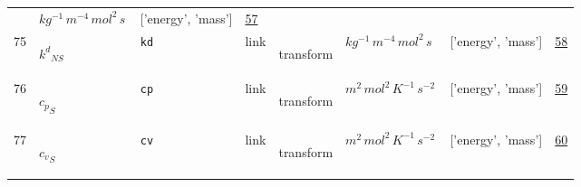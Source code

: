 \begin{longtable}{|p{1cm}|p{3cm}|p{3cm}|p{7cm}|p{3.0cm}|p{3cm}|p{2cm}|p{1cm}|}
             & $ kg^{-1} \,m^{-4} \,mol^{2} \,s \, $
             & ['energy', 'mass']
             & \hyperlink{"e:57"}{ 57 }
                 \\
    75
             & \hypertarget{"v:75"}{ $ {k^{d}}_{{N S}} $}
             & \verb|kd|
             & link
             & \begin{lay}transform \end{lay}
             & $ kg^{-1} \,m^{-4} \,mol^{2} \,s \, $
             & ['energy', 'mass']
             & \hyperlink{"e:58"}{ 58 }
                 \\
    76
             & \hypertarget{"v:76"}{ $ {c_p}_{S} $}
             & \verb|cp|
             & link
             & \begin{lay}transform \end{lay}
             & $ m^{2} \,mol^{2} \,K^{-1} \,s^{-2} \, $
             & ['energy', 'mass']
             & \hyperlink{"e:59"}{ 59 }
                 \\
    77
             & \hypertarget{"v:77"}{ $ {c_v}_{S} $}
             & \verb|cv|
             & link
             & \begin{lay}transform \end{lay}
             & $ m^{2} \,mol^{2} \,K^{-1} \,s^{-2} \, $
             & ['energy', 'mass']
             & \hyperlink{"e:60"}{ 60 }
                 \\
    \end{longtable}